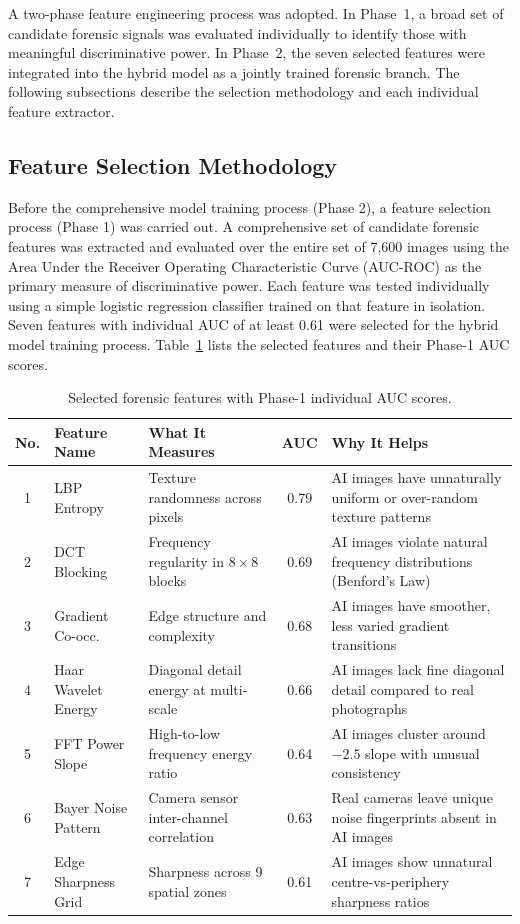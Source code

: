 A two-phase feature engineering process was adopted. In Phase~1, a broad set of candidate forensic signals was evaluated individually to identify those with meaningful discriminative power. In Phase~2, the seven selected features were integrated into the hybrid model as a jointly trained forensic branch. The following subsections describe the selection methodology and each individual feature extractor.

\subsection{Feature Selection Methodology}

Before the comprehensive model training process (Phase 2), a feature selection process (Phase 1) was carried out. A comprehensive set of candidate forensic features was extracted and evaluated over the entire set of 7,600 images using the Area Under the Receiver Operating Characteristic Curve (AUC-ROC) as the primary measure of discriminative power. Each feature was tested individually using a simple logistic regression classifier trained on that feature in isolation. Seven features with individual AUC of at least 0.61 were selected for the hybrid model training process. Table~\ref{tab:features} lists the selected features and their Phase-1 AUC scores.

\begin{table}[H]
    \centering
    \small
    \caption{Selected forensic features with Phase-1 individual AUC scores.}
    \label{tab:features}
    \begin{tabular}{c p{3cm} p{4cm} c p{3.8cm}}
        \toprule
        \textbf{No.} & \textbf{Feature Name} & \textbf{What It Measures} & \textbf{AUC} & \textbf{Why It Helps} \\
        \midrule
        1 & LBP Entropy           & Texture randomness across pixels          & 0.79 & AI images have unnaturally uniform or over-random texture patterns \\
        2 & DCT Blocking          & Frequency regularity in $8\times8$ blocks & 0.69 & AI images violate natural frequency distributions (Benford's Law) \\
        3 & Gradient Co-occ.      & Edge structure and complexity             & 0.68 & AI images have smoother, less varied gradient transitions \\
        4 & Haar Wavelet Energy   & Diagonal detail energy at multi-scale     & 0.66 & AI images lack fine diagonal detail compared to real photographs \\
        5 & FFT Power Slope       & High-to-low frequency energy ratio        & 0.64 & AI images cluster around $-2.5$ slope with unusual consistency \\
        6 & Bayer Noise Pattern   & Camera sensor inter-channel correlation   & 0.63 & Real cameras leave unique noise fingerprints absent in AI images \\
        7 & Edge Sharpness Grid   & Sharpness across 9 spatial zones          & 0.61 & AI images show unnatural centre-vs-periphery sharpness ratios \\
        \bottomrule
    \end{tabular}
\end{table}

